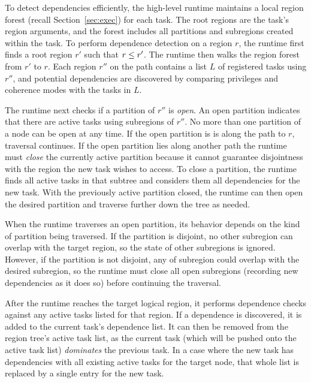 
To detect dependencies efficiently, the high-level runtime maintains a
local region forest (recall Section~\ref{sec:exec}) for each task.  The
root regions are the task's region arguments, and the forest includes
all partitions and subregions created within the task.  To perform
dependence detection on a region $r$, the runtime first finds a root
region $r'$ such that $r \leq r'$.  The runtime then walks the region
forest from $r'$ to $r$.  Each region $r''$ on the path contains a
list $L$ of registered tasks using $r''$, and potential dependencies
are discovered by comparing privileges and coherence modes with the
tasks in $L$.

The runtime next checks if a partition of $r''$ is {\em open}.  An
open partition indicates that there are active tasks using subregions
of $r''$.  No more than one partition of a node can be open
at any time.  If the open partition is is along the path to $r$,
traversal continues.  If the open partition lies along another
path the runtime must {\em close} the currently active partition because it cannot guarantee
disjointness with the region the new task wishes to access.  To close a
partition, the runtime finds all active tasks in that
subtree and considers them all dependencies for the new task.
With the previously active partition closed, the runtime can
then open the desired partition and traverse further down the tree as
needed.

When the runtime traverses an open partition, its behavior depends on the kind
of partition being traversed.  If the partition is disjoint, no other subregion
can overlap with the target region, so the state of other subregions is
ignored.  However, if the partition is not disjoint, any
of subregion could overlap with the desired subregion, so
the runtime must close all open subregions (recording new dependencies
as it does so) before continuing the traversal.

After the runtime reaches the target logical region, it performs dependence
checks against any active tasks listed for that region.  If a dependence is
discovered, it is added to the current task's dependence list.  It can then
be removed from the region tree's active task list, as the current task (which
will be pushed onto the active task list) {\em dominates} the previous task.
In a case where the new task has dependencies with all existing active tasks
for the target node, that whole list is replaced by a single entry for the
new task.


